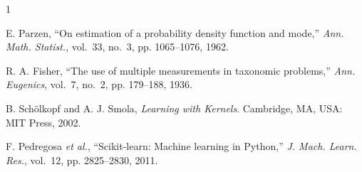 \begin{thebibliography}{1}

E. Parzen, ``On estimation of a probability density function and mode,'' \emph{Ann. Math. Statist.}, vol.~33, no.~3, pp. 1065--1076, 1962.

R. A. Fisher, ``The use of multiple measurements in taxonomic problems,'' \emph{Ann. Eugenics}, vol.~7, no.~2, pp. 179--188, 1936.

B. Sch\"olkopf and A. J. Smola, \emph{Learning with Kernels}. Cambridge, MA, USA: MIT Press, 2002.

F. Pedregosa \emph{et al.}, ``Scikit-learn: Machine learning in Python,'' \emph{J. Mach. Learn. Res.}, vol.~12, pp. 2825--2830, 2011.

\end{thebibliography}
